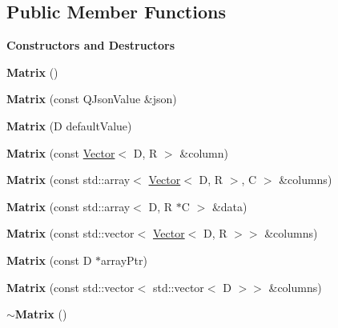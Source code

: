 \subsection*{Public Member Functions}
\begin{Indent}\textbf{ Constructors and Destructors}\par
\begin{DoxyCompactItemize}
\item 
\mbox{\label{classrev_1_1_matrix_a8465b5f74c7b1fe7789540b8e79d3994}} 
{\bfseries Matrix} ()
\item 
\mbox{\label{classrev_1_1_matrix_a59c4d868bcf66ef77a7287f62e4949f2}} 
{\bfseries Matrix} (const Q\+Json\+Value \&json)
\item 
\mbox{\label{classrev_1_1_matrix_ade93031fe8835f85307ea6585ad963a1}} 
{\bfseries Matrix} (D default\+Value)
\item 
\mbox{\label{classrev_1_1_matrix_abd93c114c15529b0a7206afa9cedc33f}} 
{\bfseries Matrix} (const \mbox{\hyperlink{classrev_1_1_vector}{Vector}}$<$ D, R $>$ \&column)
\item 
\mbox{\label{classrev_1_1_matrix_ae00cc806412fe72cc48e4b2b6a8e8fe1}} 
{\bfseries Matrix} (const std\+::array$<$ \mbox{\hyperlink{classrev_1_1_vector}{Vector}}$<$ D, R $>$, C $>$ \&columns)
\item 
\mbox{\label{classrev_1_1_matrix_ad2738ccdc1559e181671b5631f670482}} 
{\bfseries Matrix} (const std\+::array$<$ D, R $\ast$C $>$ \&data)
\item 
\mbox{\label{classrev_1_1_matrix_a20d0d57312ed75a2228eabd993c0ca86}} 
{\bfseries Matrix} (const std\+::vector$<$ \mbox{\hyperlink{classrev_1_1_vector}{Vector}}$<$ D, R $>$$>$ \&columns)
\item 
\mbox{\label{classrev_1_1_matrix_aa87421fadd81ceb348038c9ebacbd50e}} 
{\bfseries Matrix} (const D $\ast$array\+Ptr)
\item 
\mbox{\label{classrev_1_1_matrix_aae4e1f02e3bcd1ed50f46500128c1fb2}} 
{\bfseries Matrix} (const std\+::vector$<$ std\+::vector$<$ D $>$$>$ \&columns)
\item 
\mbox{\label{classrev_1_1_matrix_a8879f1d195fe62e690fa985ec133d1be}} 
{\bfseries $\sim$\+Matrix} ()
\end{DoxyCompactItemize}
\end{Indent}
